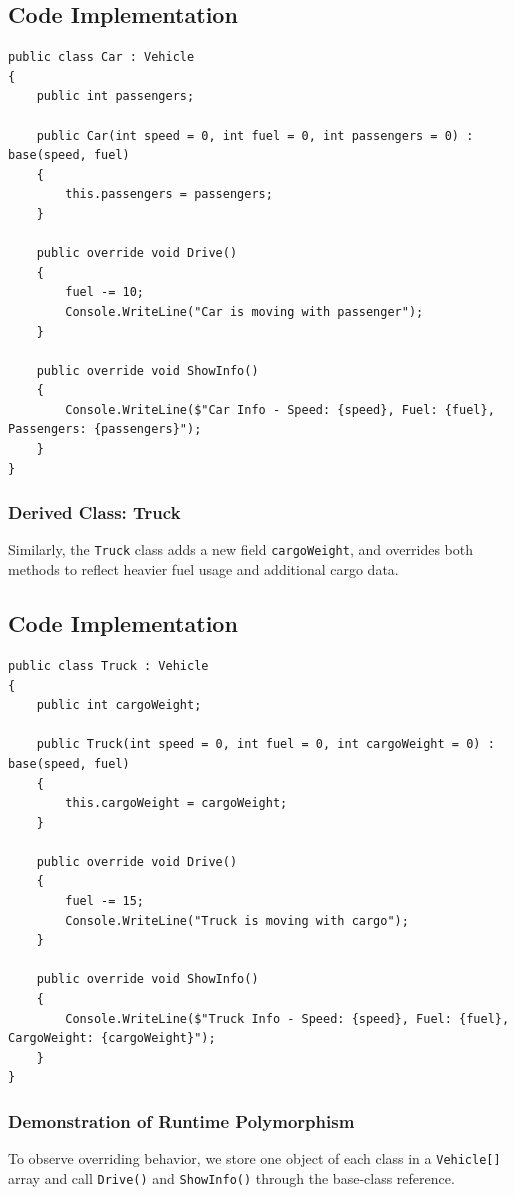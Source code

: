 \subsection*{Code Implementation}
\begin{lstlisting}
public class Car : Vehicle
{
    public int passengers;

    public Car(int speed = 0, int fuel = 0, int passengers = 0) : base(speed, fuel)
    {
        this.passengers = passengers;
    }

    public override void Drive()
    {
        fuel -= 10;
        Console.WriteLine("Car is moving with passenger");
    }

    public override void ShowInfo()
    {
        Console.WriteLine($"Car Info - Speed: {speed}, Fuel: {fuel}, Passengers: {passengers}");
    }
}
\end{lstlisting}

\subsubsection{Derived Class: Truck}
Similarly, the \texttt{Truck} class adds a new field \texttt{cargoWeight}, and overrides both methods to reflect heavier fuel usage and additional cargo data.

\subsection*{Code Implementation}
\begin{lstlisting}
public class Truck : Vehicle
{
    public int cargoWeight;

    public Truck(int speed = 0, int fuel = 0, int cargoWeight = 0) : base(speed, fuel)
    {
        this.cargoWeight = cargoWeight;
    }

    public override void Drive()
    {
        fuel -= 15;
        Console.WriteLine("Truck is moving with cargo");
    }

    public override void ShowInfo()
    {
        Console.WriteLine($"Truck Info - Speed: {speed}, Fuel: {fuel}, CargoWeight: {cargoWeight}");
    }
}
\end{lstlisting}

\subsubsection{Demonstration of Runtime Polymorphism}
To observe overriding behavior, we store one object of each class in a \texttt{Vehicle[]} array and call 
\texttt{Drive()} and \texttt{ShowInfo()} through the base-class reference.

